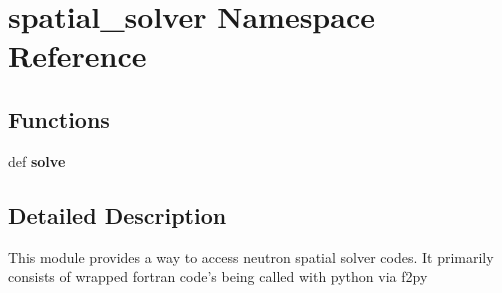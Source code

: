 \hypertarget{namespacespatial__solver}{\section{spatial\+\_\+solver Namespace Reference}
\label{namespacespatial__solver}
}
\subsection*{Functions}
\begin{DoxyCompactItemize}
\item 
\hypertarget{namespacespatial__solver_a74df1ca1dc48fff51fcfba3ef46add94}{def {\bfseries solve}}\label{namespacespatial__solver_a74df1ca1dc48fff51fcfba3ef46add94}

\end{DoxyCompactItemize}


\subsection{Detailed Description}
\begin{DoxyVerb}This module provides a way to access neutron spatial solver codes.  It primarily consists of wrapped fortran code's being called with python via f2py\end{DoxyVerb}
 
